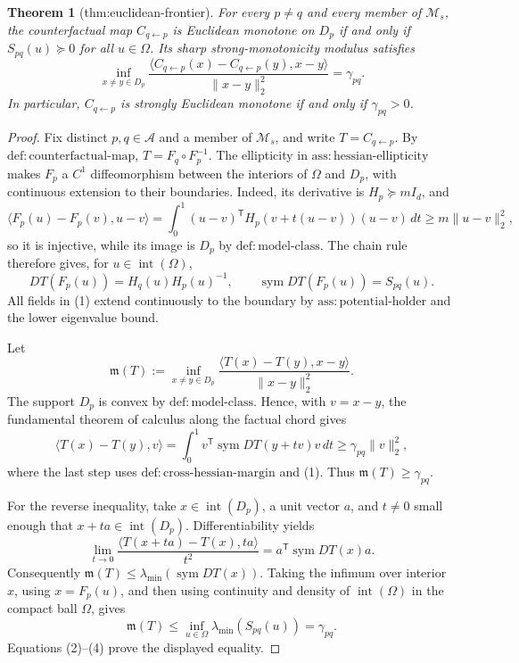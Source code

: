 \documentclass{article}
\newtheorem{theorem}{Theorem}
\begin{document}
\begin{theorem}[thm:euclidean-frontier]\label{thm:euclidean-frontier}
For every \(p\ne q\) and every member of \(\mathcal M_s\), the counterfactual map \(C_{q\leftarrow p}\) is Euclidean monotone on \(D_p\) if and only if \(S_{pq}(u)\succeq0\) for all \(u\in\Omega\). Its sharp strong-monotonicity modulus satisfies \[\inf_{x\ne y\in D_p}\frac{\langle C_{q\leftarrow p}(x)-C_{q\leftarrow p}(y),x-y\rangle}{\lVert x-y\rVert_2^2}=\gamma_{pq}.\] In particular, \(C_{q\leftarrow p}\) is strongly Euclidean monotone if and only if \(\gamma_{pq}>0\).
\end{theorem}
\begin{proof}
Fix distinct \(p,q\in\mathcal A\) and a member of \(\mathcal M_s\), and write \(T=C_{q\leftarrow p}\).  By \(\mathrm{def:counterfactual\text{-}map}\), \(T=F_q\circ F_p^{-1}\).  The ellipticity in \(\mathrm{ass:hessian\text{-}ellipticity}\) makes \(F_p\) a \(C^1\) diffeomorphism between the interiors of \(\Omega\) and \(D_p\), with continuous extension to their boundaries.  Indeed, its derivative is \(H_p\succeq mI_d\), and
\[
 \langle F_p(u)-F_p(v),u-v\rangle
 =\int_0^1 (u-v)^{\mathsf T}H_p(v+t(u-v))(u-v)\,dt
 \ge m\lVert u-v\rVert_2^2,
\]
so it is injective, while its image is \(D_p\) by \(\mathrm{def:model\text{-}class}\).  The chain rule therefore gives, for \(u\in\operatorname{int}(\Omega)\),
\[
 DT(F_p(u))=H_q(u)H_p(u)^{-1},
 \qquad
 \operatorname{sym}DT(F_p(u))=S_{pq}(u).
 \tag{1}
\]
All fields in (1) extend continuously to the boundary by \(\mathrm{ass:potential\text{-}holder}\) and the lower eigenvalue bound.

Let
\[
 \mathfrak m(T):=\inf_{x\ne y\in D_p}
 \frac{\langle T(x)-T(y),x-y\rangle}{\lVert x-y\rVert_2^2}.
\]
The support \(D_p\) is convex by \(\mathrm{def:model\text{-}class}\).  Hence, with \(v=x-y\), the fundamental theorem of calculus along the factual chord gives
\[
 \langle T(x)-T(y),v\rangle
 =\int_0^1v^{\mathsf T}\operatorname{sym}DT(y+tv)v\,dt
 \ge\gamma_{pq}\lVert v\rVert_2^2,
 \tag{2}
\]
where the last step uses \(\mathrm{def:cross\text{-}hessian\text{-}margin}\) and (1).  Thus \(\mathfrak m(T)\ge\gamma_{pq}\).

For the reverse inequality, take \(x\in\operatorname{int}(D_p)\), a unit vector \(a\), and \(t\ne0\) small enough that \(x+ta\in\operatorname{int}(D_p)\).  Differentiability yields
\[
 \lim_{t\to0}
 \frac{\langle T(x+ta)-T(x),ta\rangle}{t^2}
 =a^{\mathsf T}\operatorname{sym}DT(x)a.
 \tag{3}
\]
Consequently \(\mathfrak m(T)\le\lambda_{\min}(\operatorname{sym}DT(x))\).  Taking the infimum over interior \(x\), using \(x=F_p(u)\), and then using continuity and density of \(\operatorname{int}(\Omega)\) in the compact ball \(\Omega\), gives
\[
 \mathfrak m(T)
 \le\inf_{u\in\Omega}\lambda_{\min}(S_{pq}(u))
 =\gamma_{pq}.
 \tag{4}
\]
Equations (2)--(4) prove the displayed equality.


\end{proof}
\end{document}
